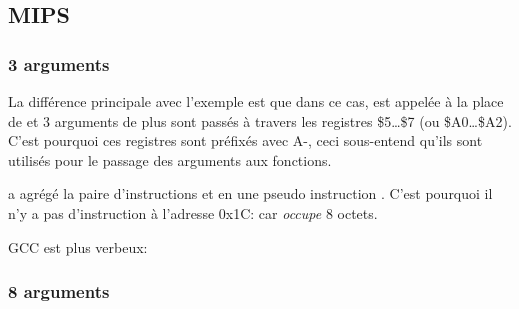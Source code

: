 \subsection{MIPS}

\subsubsection{3 arguments}


La différence principale avec l'exemple \q{\HelloWorldSectionName} est que dans ce cas, \printf est appelée
à la place de \puts et 3 arguments de plus sont passés à travers les registres \$5\dots \$7 (ou \$A0\dots \$A2).
C'est pourquoi ces registres sont préfixés avec A-, ceci sous-entend qu'ils
sont utilisés pour le passage des arguments aux fonctions.





\IDA a agrégé la paire d'instructions  et  en une pseudo instruction .
C'est pourquoi il n'y a pas d'instruction à l'adresse 0x1C: car  \emph{occupe} 8 octets.


GCC \NonOptimizing est plus verbeux:





\subsubsection{8 arguments}

